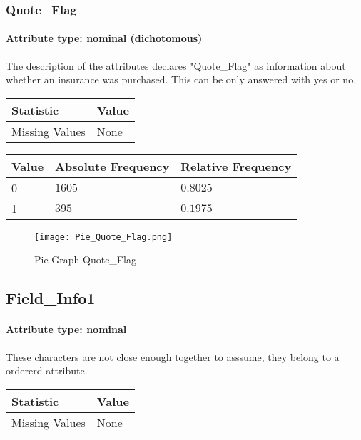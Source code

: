 \subsubsection{Quote\_Flag}
\paragraph{Attribute type: nominal (dichotomous)}
The description of the attributes declares "Quote\_Flag" as information about whether an insurance was purchased. This can be only answered with yes or no.

\begin{table}[H]
	\renewcommand{\arraystretch}{1.25}
	\begin{tabular}{l|l}
		\textbf{Statistic} & \textbf{Value}\\\hline
		Missing Values& None\\\hline
	\end{tabular}
\end{table}

\begin{table}[H]
	\renewcommand{\arraystretch}{1.25}
		\begin{tabular}{l|l|l}
			\textbf{Value} & \textbf{Absolute Frequency} & \textbf{Relative Frequency}\\\hline
			0 & $1605$ & $0.8025$\\ \hline
			1 & $395$ & $0.1975$\\
		\end{tabular}
\end{table}

\begin{figure}[H]
	\begin{center}
		\texttt{[image: Pie\_Quote\_Flag.png]}
	\end{center}
	\caption{Pie Graph Quote\_Flag}
\end{figure}


\subsection{Field\_Info1}
\paragraph{Attribute type: nominal} These characters are not close enough together to asssume, they belong to a ordererd attribute.

\begin{table}[H]
	\renewcommand{\arraystretch}{1.25}
	\begin{tabular}{l|l}
		\textbf{Statistic} & \textbf{Value}\\\hline
		Missing Values& None\\\hline
	\end{tabular}
\end{table}


